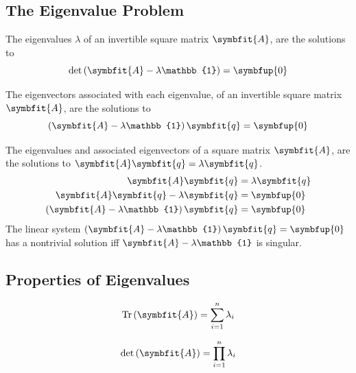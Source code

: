 \documentclass{article}
\begin{document}
	\subsection{The Eigenvalue Problem}
	\begin{theorem}
		The eigenvalues $\lambda$ of an invertible square matrix $\symbfit{A}$, are the solutions to 
		\begin{equation*}
			\det{\left( \symbfit{A} - \lambda\mathbb{1} \right)}=\symbfup{0}
		\end{equation*} 
	\end{theorem}
	\begin{theorem}
		The eigenvectors associated with each eigenvalue, of an invertible square matrix $\symbfit{A}$, are the solutions to
		\begin{equation*}
			\left( \symbfit{A} - \lambda \mathbb{1} \right) \symbfit{q}=\symbfup{0}
		\end{equation*}
	\end{theorem}
	\begin{solution}[Proof]
	The eigenvalues and associated eigenvectors of a square matrix $\symbfit{A}$, are the solutions to $\symbfit{A}\symbfit{q}=\lambda \symbfit{q}$.
	\begin{align*}
		\symbfit{A}\symbfit{q}&=\lambda \symbfit{q} \\
		\symbfit{A}\symbfit{q} - \lambda \symbfit{q}&=\symbfup{0} \\
		\left( \symbfit{A} - \lambda \mathbb{1} \right) \symbfit{q}&=\symbfup{0}
	\end{align*}
	The linear system $\left( \symbfit{A} - \lambda\mathbb{1} \right) \symbfit{q}=\symbfup{0}$ has a nontrivial solution iff $\symbfit{A} - \lambda \mathbb{1}$ is singular.
	\end{solution}
	\subsection{Properties of Eigenvalues}
	\begin{theorem}
		\begin{equation*}
			\tr{\left( \symbfit{A} \right)} = \sum_{i=1}^n \lambda_i
		\end{equation*}
	\end{theorem}
	\begin{theorem}
		\begin{equation*}
			\det{\left( \symbfit{A} \right)} = \prod_{i=1}^n \lambda_i
		\end{equation*}
	\end{theorem}
	\newpage
\end{document}
